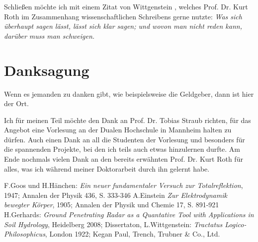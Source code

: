 \documentclass[10pt,twocolumn]{scrartcl}
\begin{document}
Schließen möchte ich mit einem Zitat von Wittgenstein \cite{Wittgenstein1922},
welches Prof. Dr. Kurt Roth im Zusammenhang wissenschaftlichen
Schreibens gerne nutzte: {\it Was sich überhaupt sagen lässt, lässt
sich klar sagen; und wovon man nicht reden kann, darüber muss man
schweigen.} 

\section*{Danksagung}

Wenn es jemanden zu danken gibt, wie beispielsweise die Geldgeber, 
dann ist hier der Ort. 

Ich für meinen Teil möchte den Dank an Prof. Dr. Tobias Straub
richten, für das Angebot eine Vorlesung an der Dualen Hochschule in
Mannheim halten zu dürfen. Auch einen Dank an all die Studenten der Vorlesung
und besonders für die spannenden Projekte, bei den ich teils auch 
etwas hinzulernen durfte. Am Ende nochmals vielen Dank 
an den bereits erwähnten Prof. Dr. Kurt Roth für alles, 
was ich während meiner Doktorarbeit durch ihn gelernt habe.

\begin{thebibliography}{99}
F.Goos und H.Hänchen: {\it Ein neuer fundamentaler Versuch zur Totalreflektion}, 1947; Annalen der Physik 436, S. 333-346
A.Einstein {\it Zur Elektrodynamik bewegter Körper}, 1905; Annalen der Physik und Chemie 17, S. 891-921
H.Gerhards: {\it Ground Penetrating Radar as a Quantative Tool with Applications in Soil Hydrology}, Heidelberg 2008; Dissertaton,
L.Wittgenstein: {\it Tractatus Logico-Philo\-so\-phi\-cus}, London 1922; Kegan Paul, Trench, Trubner \& Co., Ltd.
\end{thebibliography}
\end{document}
